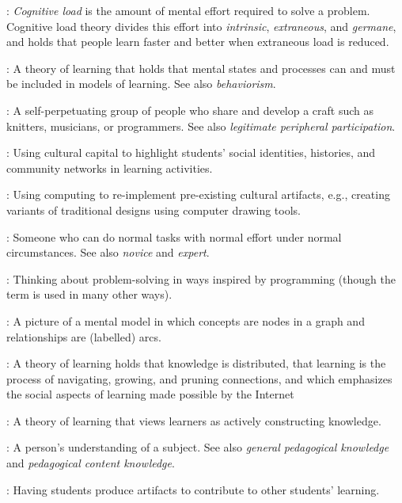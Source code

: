 \begin{description}
: \emph{Cognitive
load} is the amount of mental effort required to solve a problem.
Cognitive load theory divides this effort into \emph{intrinsic},
\emph{extraneous}, and \emph{germane}, and holds that people learn faster and
better when extraneous load is reduced.

: A theory of learning that holds
that mental states and processes can and must be included in models of
learning. See also \emph{behaviorism}.

: A
self-perpetuating group of people who share and develop a craft such as
knitters, musicians, or programmers. See also \emph{legitimate peripheral
participation}.

: Using
cultural capital to highlight students' social identities, histories,
and community networks in learning activities.

:
Using computing to re-implement pre-existing cultural artifacts, e.g.,
creating variants of traditional designs using computer drawing tools.

: Someone
who can do normal tasks with normal effort under normal circumstances.
See also \emph{novice} and \emph{expert}.

: Thinking
about problem-solving in ways inspired by programming (though the term
is used in many other ways).

: A picture of a mental model in
which concepts are nodes in a graph and relationships are (labelled)
arcs.

: A theory of learning holds
that knowledge is distributed, that learning is the process of
navigating, growing, and pruning connections, and which emphasizes the
social aspects of learning made possible by the Internet

: A theory of learning that
views learners as actively constructing knowledge.

: A person's
understanding of a subject. See also \emph{general pedagogical knowledge} and
\emph{pedagogical content knowledge}.

:
Having students produce artifacts to contribute to other students'
learning.


\end{description}
